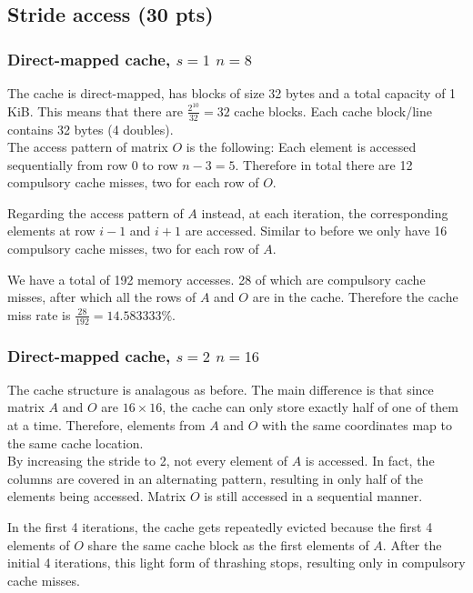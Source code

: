 \renewcommand{\thesubsubsection}{\alph{subsubsection})}
\setcounter{section}{4}
\setcounter{subsection}{0}
\renewcommand{\thesubsubsection}{\alph{subsubsection})}

\subsection{Stride access (30 pts)}
\subsubsection{Direct-mapped cache, $s=1$ $n=8$}
The cache is direct-mapped, has blocks of size 32 bytes and a total capacity of 1 KiB. This means that there are $\frac{2^{10}}{32} = 32$ cache blocks. Each cache block/line contains 32 bytes (4 doubles).\\

The access pattern of matrix $O$ is the following: Each element is accessed sequentially from row $0$ to row $n-3=5$. Therefore in total there are 12 compulsory cache misses, two for each row of $O$.

Regarding the access pattern of $A$ instead, at each iteration, the corresponding elements at row $i-1$ and $i+1$ are accessed. Similar to before we only have 16 compulsory cache misses, two for each row of $A$.

We have a total of 192 memory accesses. 28 of which are compulsory cache misses, after which all the rows of $A$ and $O$ are in the cache. Therefore the cache miss rate is $\frac{28}{192}  = 14.583333\%$.\vspace*{-0.4cm}
\subsubsection{Direct-mapped cache, $s=2$ $n=16$}
The cache structure is analagous as before. The main difference is that since matrix $A$ and $O$ are $16\times16$, the cache can only store exactly half of one of them at a time. Therefore, elements from $A$ and $O$ with the same coordinates map to the same cache location.\\
By increasing the stride to 2, not every element of $A$ is accessed. In fact, the columns are covered in an alternating pattern, resulting in only half of the elements being accessed. Matrix $O$ is still accessed in a sequential manner.

In the first 4 iterations, the cache gets repeatedly evicted because the first 4 elements of $O$ share the same cache block as the first elements of $A$. After the initial 4 iterations, this light form of thrashing stops, resulting only in compulsory cache misses.

